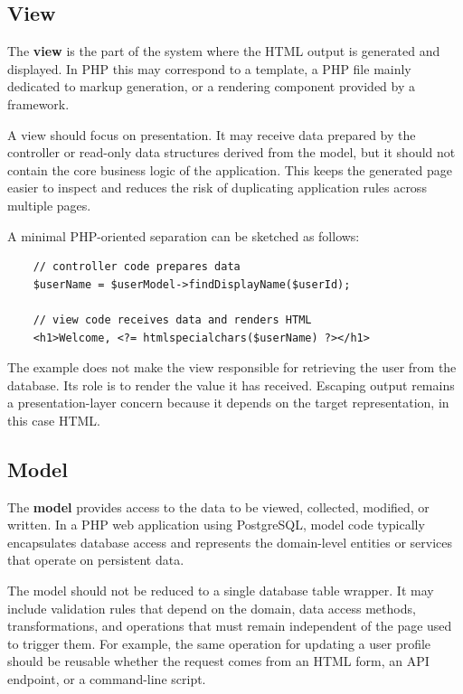 \documentclass{scrbook}
\begin{document}
	\subsection{View}
	
	The \textbf{view} is the part of the system where the HTML output is generated and displayed. In PHP this may correspond to a template, a PHP file mainly dedicated to markup generation, or a rendering component provided by a framework.
	
	A view should focus on presentation. It may receive data prepared by the controller or read-only data structures derived from the model, but it should not contain the core business logic of the application. This keeps the generated page easier to inspect and reduces the risk of duplicating application rules across multiple pages.
	
	A minimal PHP-oriented separation can be sketched as follows:
	
	\begin{lstlisting}
	// controller code prepares data
	$userName = $userModel->findDisplayName($userId);
		
	// view code receives data and renders HTML
	<h1>Welcome, <?= htmlspecialchars($userName) ?></h1>
	\end{lstlisting}
	
	The example does not make the view responsible for retrieving the user from the database. Its role is to render the value it has received. Escaping output remains a presentation-layer concern because it depends on the target representation, in this case HTML.
	
	\subsection{Model}
	
	The \textbf{model} provides access to the data to be viewed, collected, modified, or written. In a PHP web application using PostgreSQL, model code typically encapsulates database access and represents the domain-level entities or services that operate on persistent data.
	
	The model should not be reduced to a single database table wrapper. It may include validation rules that depend on the domain, data access methods, transformations, and operations that must remain independent of the page used to trigger them. For example, the same operation for updating a user profile should be reusable whether the request comes from an HTML form, an API endpoint, or a command-line script.
	
\end{document}
